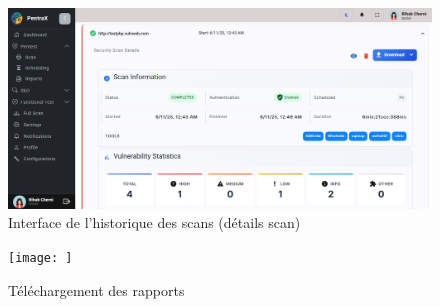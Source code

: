 \begin{justify}
\begin{enumerate}[label=\Alph*.]
                     \begin{figure}[H]
                        \centering
                        \includegraphics[width=\textwidth]{chapitres/ch3Sp1/section/sprint2/img/interface/details-sec1.PNG}
                        \caption{Interface de l’historique des scans (détails scan)}
                        \label{fig:interface_historique_details}
                    \end{figure}
                    \begin{figure}[H]
                        \centering
                        \texttt{[image: ]}
                        \caption{Téléchargement des rapports}
                        \label{fig:interface_export_rapports}
                    \end{figure}
    

\end{enumerate}
\end{justify}
